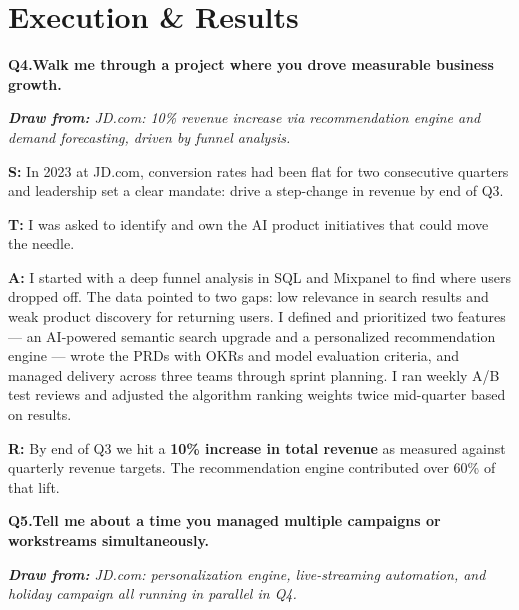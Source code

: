 \documentclass[10pt, letterpaper]{article}
\newcommand{\q}[2]{%
    \smallskip
    \noindent\textbf{\small Q#1.}\quad\textbf{#2}
    \vspace{3pt}
}
\newcommand{\hint}[1]{%
    \begin{notebox}
    \footnotesize\textit{\textbf{Draw from:} #1}
    \end{notebox}
}
\newcommand{\s}[1]{\textbf{\textcolor{starlabel}{S:}} #1}
\newcommand{\ta}[1]{\textbf{\textcolor{starlabel}{T:}} #1}
\newcommand{\ac}[1]{\textbf{\textcolor{starlabel}{A:}} #1}
\newcommand{\res}[1]{\textbf{\textcolor{starlabel}{R:}} #1}
\begin{document}
\section{Execution \& Results}

\q{4}{Walk me through a project where you drove measurable business growth.}
\hint{JD.com: 10\% revenue increase via recommendation engine and demand forecasting, driven by funnel analysis.}

\begin{answerbox}
\footnotesize
\s{In 2023 at JD.com, conversion rates had been flat for two consecutive quarters and leadership set a clear mandate: drive a step-change in revenue by end of Q3.}

\medskip
\ta{I was asked to identify and own the AI product initiatives that could move the needle.}

\medskip
\ac{I started with a deep funnel analysis in SQL and Mixpanel to find where users dropped off. The data pointed to two gaps: low relevance in search results and weak product discovery for returning users. I defined and prioritized two features --- an AI-powered semantic search upgrade and a personalized recommendation engine --- wrote the PRDs with OKRs and model evaluation criteria, and managed delivery across three teams through sprint planning. I ran weekly A/B test reviews and adjusted the algorithm ranking weights twice mid-quarter based on results.}

\medskip
\res{By end of Q3 we hit a \textbf{10\% increase in total revenue} as measured against quarterly revenue targets. The recommendation engine contributed over 60\% of that lift.}
\end{answerbox}

\q{5}{Tell me about a time you managed multiple campaigns or workstreams simultaneously.}
\hint{JD.com: personalization engine, live-streaming automation, and holiday campaign all running in parallel in Q4.}
\end{document}
